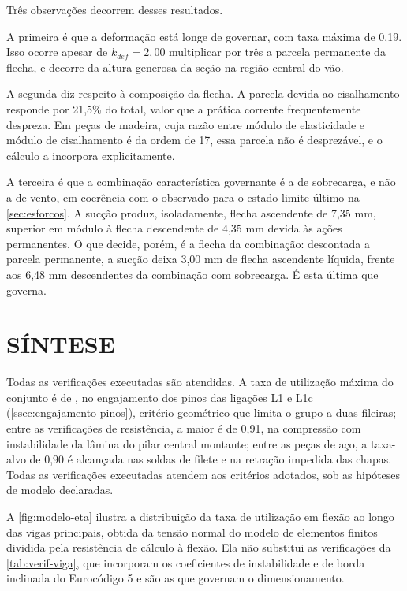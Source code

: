 Três observações decorrem desses resultados.

A primeira é que a deformação está longe de governar, com taxa máxima de 0,19.
Isso ocorre apesar de $k_{def} = 2{,}00$ multiplicar por três a parcela
permanente da flecha, e decorre da altura generosa da seção na região central do
vão.

A segunda diz respeito à composição da flecha. A parcela devida ao cisalhamento
responde por 21,5\% do total, valor que a prática corrente frequentemente
despreza. Em peças de madeira, cuja razão entre módulo de elasticidade e módulo
de cisalhamento é da ordem de 17, essa parcela não é desprezável, e o
cálculo a incorpora explicitamente.

A terceira é que a combinação característica governante é a de sobrecarga, e não
a de vento, em coerência com o observado para o estado-limite último na
\autoref{sec:esforcos}. A sucção produz, isoladamente, flecha ascendente de
7,35 mm, superior em módulo à flecha descendente de 4,35 mm devida às ações
permanentes. O que decide, porém, é a flecha da combinação: descontada a parcela
permanente, a sucção deixa 3,00 mm de flecha ascendente líquida, frente aos
6,48 mm descendentes da combinação com sobrecarga. É esta última que governa.

\section{SÍNTESE}\label{sec:sintese-dimensionamento}

Todas as verificações executadas são atendidas. A taxa de utilização máxima do
conjunto é de \etaMaxGlobal, no engajamento dos pinos das ligações L1 e L1c
(\autoref{ssec:engajamento-pinos}), critério geométrico que limita o grupo a duas
fileiras; entre as verificações de resistência, a maior é de 0,91, na compressão
com instabilidade da lâmina do pilar central montante; entre as peças de aço, a taxa-alvo de 0,90 é alcançada nas soldas
de filete e na retração impedida das chapas. Todas as verificações executadas
atendem aos critérios adotados, sob as hipóteses de modelo declaradas.

A \autoref{fig:modelo-eta} ilustra a distribuição da taxa de utilização em
flexão ao longo das vigas principais, obtida da tensão normal do modelo de
elementos finitos dividida pela resistência de cálculo à flexão. Ela não
substitui as verificações da \autoref{tab:verif-viga}, que incorporam os
coeficientes de instabilidade e de borda inclinada do Eurocódigo 5 e são as que
governam o dimensionamento.

